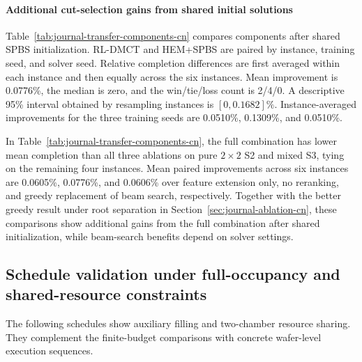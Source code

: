 \documentclass[final,5p,times,twocolumn]{elsarticle}
\begin{document}
\paragraph{Additional cut-selection gains from shared initial solutions}
Table~\ref{tab:journal-transfer-components-cn} compares components after shared SPBS initialization. RL-DMCT and HEM+SPBS are paired by instance, training seed, and solver seed. Relative completion differences are first averaged within each instance and then equally across the six instances. Mean improvement is 0.0776\%, the median is zero, and the win/tie/loss count is 2/4/0. A descriptive 95\% interval obtained by resampling instances is $[0,0.1682]\%$. Instance-averaged improvements for the three training seeds are 0.0510\%, 0.1309\%, and 0.0510\%.


\begin{table}[!htbp]
\centering\small
\caption{Components with shared SPBS inputs (mean product completion, s)}
\label{tab:journal-transfer-components-cn}
\end{table}


In Table~\ref{tab:journal-transfer-components-cn}, the full combination has lower mean completion than all three ablations on pure $2\times2$ S2 and mixed S3, tying on the remaining four instances. Mean paired improvements across six instances are 0.0605\%, 0.0776\%, and 0.0606\% over feature extension only, no reranking, and greedy replacement of beam search, respectively. Together with the better greedy result under root separation in Section~\ref{sec:journal-ablation-cn}, these comparisons show additional gains from the full combination after shared initialization, while beam-search benefits depend on solver settings.

\subsection{Schedule validation under full-occupancy and shared-resource constraints}
\label{sec:coverage-scale-cn}
The following schedules show auxiliary filling and two-chamber resource sharing. They complement the finite-budget comparisons with concrete wafer-level execution sequences.
\end{document}
